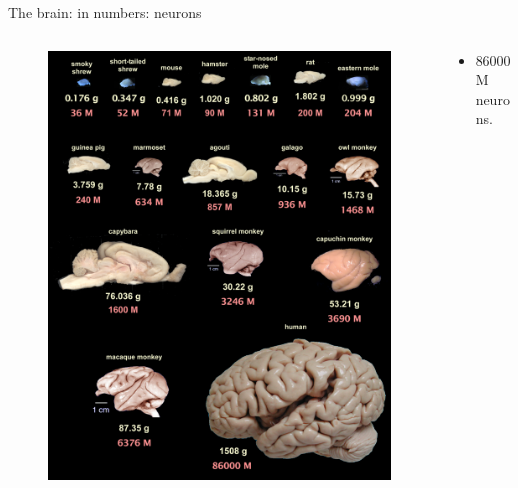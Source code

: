 \begin{frame}[c]{The brain: in numbers: neurons}
  \begin{columns}
    \begin{column}{0.5\textwidth}
      \begin{figure}[h]
        \centering
        \includegraphics[width=\textwidth]{99_images/brain-sizes.jpg}
      \end{figure}
    \end{column}
    \begin{column}{0.5\textwidth}
      \begin{itemize}
        \item \alert{86000M} neurons\footnotemark{}.
      \end{itemize}
    \end{column}
  \end{columns}
  \vspace{0.2cm}
\end{frame}
